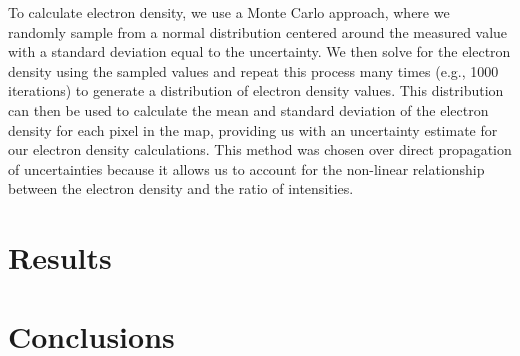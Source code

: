 To calculate electron density, we use a Monte Carlo approach, where we randomly sample from a normal distribution centered around the measured value with a standard deviation equal to the uncertainty.
We then solve for the electron density using the sampled values and repeat this process many times (e.g., 1000 iterations) to generate a distribution of electron density values.
This distribution can then be used to calculate the mean and standard deviation of the electron density for each pixel in the map, providing us with an uncertainty estimate for our electron density calculations.
This method was chosen over direct propagation of uncertainties because it allows us to account for the non-linear relationship between the electron density and the ratio of intensities. 
\section{Results}

\section{Conclusions}



